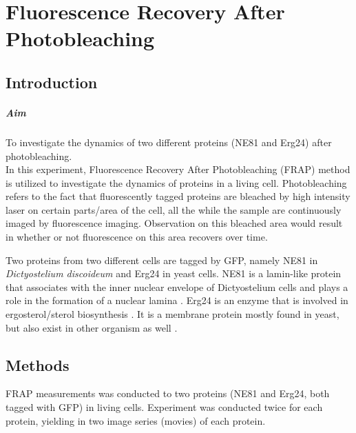 
\chapter{Fluorescence Recovery After Photobleaching}
\label{chp:FRAP}

\section{Introduction}

\paragraph{Aim} To investigate the dynamics of two different proteins (NE81 and Erg24) after photobleaching.
\\

In this experiment, Fluorescence Recovery After Photobleaching (FRAP) method is utilized to investigate the dynamics of proteins in a living cell. 
Photobleaching refers to the fact that fluorescently tagged proteins are bleached by high intensity laser on certain parts/area of the cell, all the while the sample are continuously imaged by fluorescence imaging. 
Observation on this bleached area would result in whether or not fluorescence on this area recovers over time.

Two proteins from two different cells are tagged by GFP, namely NE81 in \textit{Dictyostelium discoideum} and Erg24 in yeast cells. 
NE81 is a lamin-like protein that associates with the inner nuclear envelope of Dictyostelium cells and plays a role in the formation of a nuclear lamina \cite{Krueger2012}. 
Erg24 is an enzyme that is involved in ergosterol/sterol biosynthesis \cite{UniprotErg24}. It is a membrane protein mostly found in yeast, but also exist in other organism as well \cite{Batsios2019}.


\section{Methods}
FRAP measurements was conducted to two proteins (NE81 and Erg24, both tagged with GFP) in living cells. 
Experiment was conducted twice for each protein, yielding in two image series (movies) of each protein.

